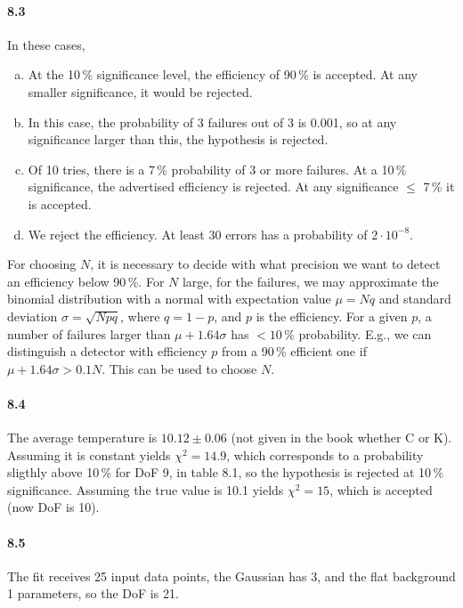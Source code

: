 \documentclass[a4paper,12pt]{article}
\begin{document}
\paragraph{8.3} In these cases,
\begin{enumerate}[(a)]
 \item At the 10\,\% significance level, the efficiency of 90\,\% is accepted. At any smaller significance, it would be rejected.
 
 \item In this case, the probability of 3 failures out of 3 is 0.001, so at any significance larger than this, the hypothesis is rejected.
  
 \item Of 10 tries, there is a 7\,\% probability of 3 or more failures. At a 10\,\% significance, the advertised efficiency is rejected. At any significance $\le$ 7\,\% it is accepted.
 
 \item We reject the efficiency. At least 30 errors has a probability of $2\cdot10^{-8}$.
\end{enumerate}
For choosing $N$, it is necessary to decide with what precision we want to detect an efficiency below 90\,\%. For $N$ large, for the failures, we may approximate the binomial distribution with a normal with expectation value $\mu = Nq$ and standard deviation $\sigma = \sqrt{Npq}$, where $q=1-p$, and $p$ is the efficiency. For a given $p$, a number of failures larger than $\mu + 1.64 \sigma$ has $< 10\,\%$ probability. E.g., we can distinguish a detector with efficiency $p$ from a 90\,\% efficient one if $\mu + 1.64 \sigma > 0.1 N$. This can be used to choose $N$.

\paragraph{8.4} The average temperature is $10.12 \pm 0.06$ (not given in the book whether C or K). Assuming it is constant yields $\chi^2 = 14.9$, which corresponds to a probability sligthly above 10\,\% for DoF 9, in table 8.1, so the hypothesis is rejected at 10\,\% significance. Assuming the true value is 10.1 yields $\chi^2 = 15$, which is accepted (now DoF is 10).

\paragraph{8.5} The fit receives 25 input data points, the Gaussian has 3, and the flat background 1 parameters, so the DoF is 21.
\end{document}
